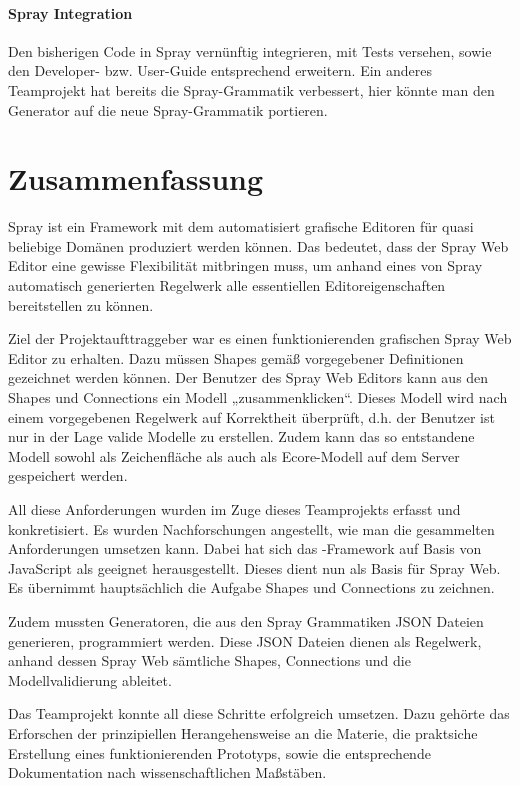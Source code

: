 \paragraph{Spray Integration}

Den bisherigen Code in Spray vernünftig integrieren, mit Tests versehen, sowie
den Developer- bzw. User-Guide entsprechend erweitern.
Ein anderes Teamprojekt hat bereits die Spray-Grammatik verbessert,
hier könnte man den Generator auf die neue Spray-Grammatik portieren.


\section{Zusammenfassung}

Spray ist ein Framework mit dem automatisiert grafische Editoren für quasi
beliebige Domänen produziert werden können. Das bedeutet, dass der Spray Web Editor
eine gewisse Flexibilität mitbringen muss, um anhand eines von
Spray automatisch generierten Regelwerk alle essentiellen Editoreigenschaften
bereitstellen zu können.

Ziel der Projektaufttraggeber war es einen funktionierenden grafischen Spray Web
Editor zu erhalten. Dazu müssen Shapes gemäß vorgegebener Definitionen
gezeichnet werden können.
Der Benutzer des Spray Web Editors kann aus den Shapes und Connections ein Modell
„zusammenklicken“. Dieses Modell wird nach einem vorgegebenen Regelwerk auf
Korrektheit überprüft, d.h. der Benutzer ist nur in der Lage valide Modelle
zu erstellen. Zudem kann das so entstandene Modell sowohl als Zeichenfläche als auch als Ecore-Modell
auf dem Server gespeichert werden.

All diese Anforderungen wurden im Zuge dieses Teamprojekts erfasst und konkretisiert.
Es wurden Nachforschungen angestellt, wie man die gesammelten Anforderungen
umsetzen kann. Dabei hat sich das \dd-Framework auf Basis von JavaScript als
geeignet herausgestellt. Dieses dient nun als Basis für Spray Web.
Es übernimmt hauptsächlich die Aufgabe Shapes und Connections zu zeichnen.

Zudem mussten Generatoren, die aus den Spray Grammatiken JSON Dateien
generieren, programmiert werden. Diese JSON Dateien dienen als Regelwerk,
anhand dessen Spray Web sämtliche Shapes, Connections und die Modellvalidierung
ableitet.

Das Teamprojekt konnte all diese Schritte erfolgreich umsetzen.
Dazu gehörte das Erforschen der prinzipiellen Herangehensweise an die Materie,
die praktsiche Erstellung eines funktionierenden Prototyps,
sowie die entsprechende Dokumentation nach wissenschaftlichen Maßstäben.
